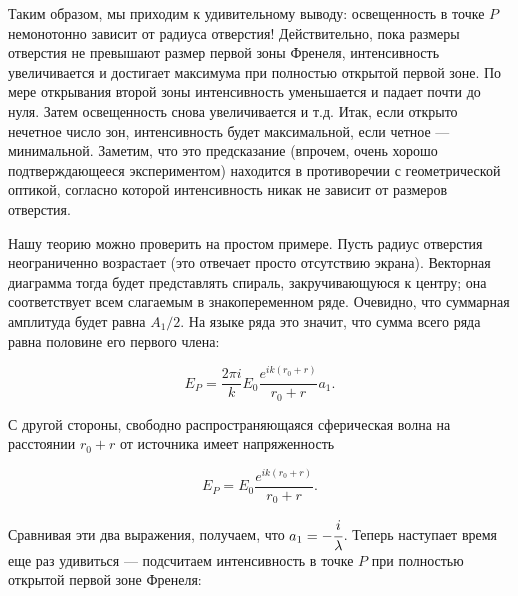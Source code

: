 \documentclass[12pt,a4paper]{article}
\numberwithin{equation}{section}
\numberwithin{equation}{section}
\begin{document}
Таким образом, мы приходим к удивительному выводу: освещенность в
точке $P$ немонотонно зависит от радиуса отверстия! Действительно,
пока размеры отверстия не превышают размер первой зоны Френеля,
интенсивность увеличивается и достигает максимума при полностью
открытой первой зоне. По мере открывания второй зоны интенсивность
уменьшается и падает почти до нуля. Затем освещенность снова
увеличивается и т.д. Итак, если открыто нечетное число зон,
интенсивность будет максимальной, если четное ---
минимальной. Заметим, что это предсказание (впрочем, очень хорошо
подтверждающееся экспериментом) находится в противоречии с
геометрической оптикой, согласно которой интенсивность никак не
зависит от размеров отверстия.

\begin{figure}
  \vspace{-0.7cm}
  \begin{center}
  \end{center}
  \label{fig:spiral}
\end{figure}

Нашу теорию можно проверить на простом примере. Пусть радиус отверстия
неограниченно возрастает (это отвечает просто отсутствию
экрана). Векторная диаграмма тогда будет представлять спираль,
закручивающуюся к центру; она соответствует всем слагаемым в
знакопеременном ряде.  Очевидно, что суммарная амплитуда будет равна
$A_1/2$. На языке ряда это значит, что сумма всего ряда равна половине
его первого члена:

\begin{equation}
E_P = \frac{2\pi i}{k} E_0 \frac{e^{i k (r_0 + r)}}{r_0 + r} a_1.
\end{equation}

С другой стороны, свободно распространяющаяся сферическая волна на
расстоянии $r_0 + r$ от источника имеет напряженность

\begin{equation}
E_P = E_0 \frac{e^{i k (r_0 + r)}}{r_0 + r}.
\end{equation}

Сравнивая эти два выражения, получаем, что $a_1 =
-\cfrac{i}{\lambda}$. Теперь наступает время еще раз удивиться ---
подсчитаем интенсивность в точке $P$ при полностью открытой первой зоне
Френеля:
\end{document}
